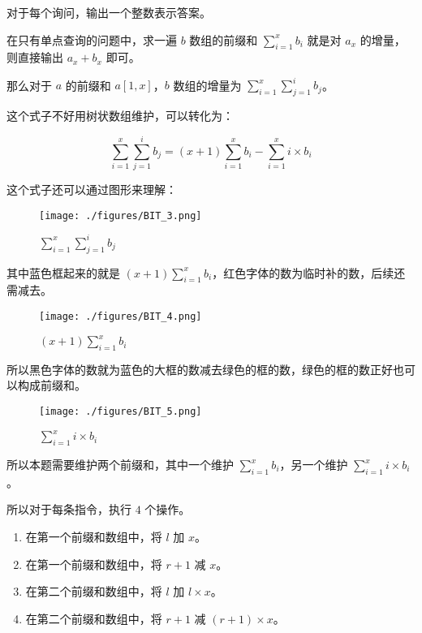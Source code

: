 对于每个询问，输出一个整数表示答案。

在只有单点查询的问题中，求一遍 $b$ 数组的前缀和 $\sum\limits^x_{i=1}b_i$ 就是对 $a_x$ 的增量，则直接输出 $a_x + b_x$ 即可。

那么对于 $a$ 的前缀和 $a[1, x]$，$b$ 数组的增量为 $\sum\limits^x_{i=1}\sum\limits^i_{j=1}b_j$。

这个式子不好用树状数组维护，可以转化为：

\begin{equation}
\sum\limits^x_{i=1}\sum\limits^i_{j=1}b_j = (x + 1)\sum\limits^x_{i=1}b_i - \sum\limits^x_{i=1}i \times b_i
\end{equation}

这个式子还可以通过图形来理解：

\begin{figure}[ht]
\centering
\texttt{[image: ./figures/BIT\_3.png]}
\caption{$\sum\limits^x_{i=1}\sum\limits^i_{j=1}b_j$} \label{BIT_fig3}
\end{figure}


其中蓝色框起来的就是 $(x + 1)\sum\limits^x_{i=1}b_i$，红色字体的数为临时补的数，后续还需减去。

\begin{figure}[ht]
\centering
\texttt{[image: ./figures/BIT\_4.png]}
\caption{$(x + 1)\sum\limits^x_{i=1}b_i$} \label{BIT_fig4}
\end{figure}

所以黑色字体的数就为蓝色的大框的数减去绿色的框的数，绿色的框的数正好也可以构成前缀和。

\begin{figure}[ht]
\centering
\texttt{[image: ./figures/BIT\_5.png]}
\caption{$\sum\limits^x_{i=1}i \times b_i$} \label{BIT_fig5}
\end{figure}

所以本题需要维护两个前缀和，其中一个维护 $\sum\limits^x_{i=1}b_i$，另一个维护 $\sum\limits^x_{i=1}i \times b_i$。

所以对于每条指令，执行 $4$ 个操作。

\begin{enumerate}
\item 在第一个前缀和数组中，将 $l$ 加 $x$。
\item 在第一个前缀和数组中，将 $r+1$ 减 $x$。
\item 在第二个前缀和数组中，将 $l$ 加 $l \times x$。
\item 在第二个前缀和数组中，将 $r + 1$ 减 $(r + 1) \times x$。
\end{enumerate}


